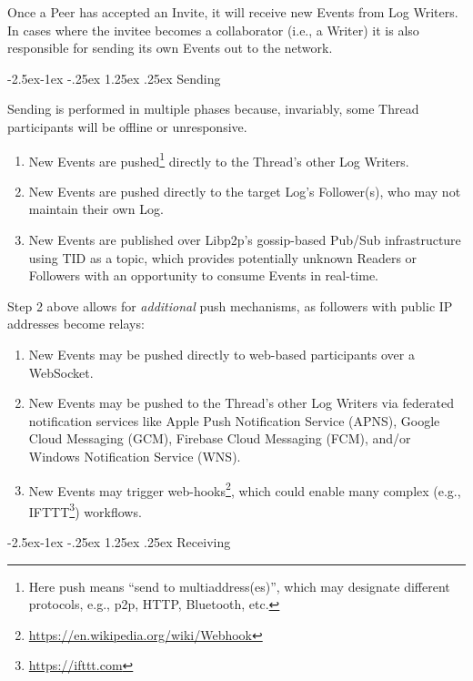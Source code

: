 \documentclass{textile}
\makeatletter
\renewcommand\paragraph{\@startsection{paragraph}{4}{\z@}%
            {-2.5ex\@plus -1ex \@minus -.25ex}%
            {1.25ex \@plus .25ex}%
            {\normalfont\normalsize\itshape}}
\makeatother
\begin{document}
Once a Peer has accepted an Invite, it will receive new Events from Log Writers.
In cases where the invitee becomes a collaborator (i.e., a Writer) it is also responsible for sending its own Events out to the network.

\paragraph{Sending}

Sending is performed in multiple phases because, invariably, some Thread participants will be offline or unresponsive. 

\begin{enumerate}
\item New Events are pushed\footnote{Here push means ``send to multiaddress(es)'', which may designate different protocols, e.g., p2p, HTTP, Bluetooth, etc.} directly to the Thread's other Log Writers.
\item New Events are pushed directly to the target Log's Follower(s), who may not maintain their own Log.
\item New Events are published over Libp2p's gossip-based Pub/Sub infrastructure using TID as a topic, which provides potentially unknown Readers or Followers with an opportunity to consume Events in real-time.
\end{enumerate}

Step 2 above allows for \emph{additional} push mechanisms, as followers with public IP addresses become relays:

\begin{enumerate}
\item New Events may be pushed directly to web-based participants over a WebSocket.
\item New Events may be pushed to the Thread's other Log Writers via federated notification services like Apple Push Notification Service (APNS), Google Cloud Messaging (GCM), Firebase Cloud Messaging (FCM), and/or Windows Notification Service (WNS).
\item New Events may trigger web-hooks\footnote{\url{https://en.wikipedia.org/wiki/Webhook}}, which could enable many complex (e.g., IFTTT\footnote{\url{https://ifttt.com}}) workflows.
\end{enumerate}

\paragraph{Receiving}
\end{document}
